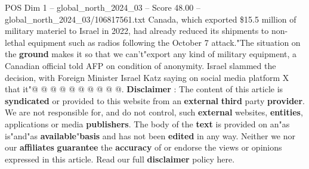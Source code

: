 \begin{textsample}{POS Dim 1 – global\_north\_2024\_03 – Score 48.00 – global\_north\_2024\_03/106817561.txt}
Canada, which exported \$15.5 million of military materiel to Israel in 2022, had already reduced its shipments to non-lethal equipment such as radios following the October 7 attack."The situation on the \textbf{ground} makes it so that we can't"export any kind of military equipment, a Canadian official told AFP on condition of anonymity.
Israel slammed the decision, with Foreign Minister Israel Katz saying on social media platform X that it"@ @ @ @ @ @ @ @ @ @. \textbf{Disclaimer} : The content of this article is \textbf{syndicated} or provided to this website from an \textbf{external} \textbf{third} party \textbf{provider}.
We are not responsible for, and do not control, such \textbf{external} websites, \textbf{entities}, applications or media \textbf{publishers}.
The body of the \textbf{text} is provided on an"as is"and"as \textbf{available}"\textbf{basis} and has not been \textbf{edited} in any way.
Neither we nor our \textbf{affiliates} \textbf{guarantee} the \textbf{accuracy} of or endorse the views or opinions expressed in this article.
Read our full \textbf{disclaimer} policy here.

\end{textsample}
